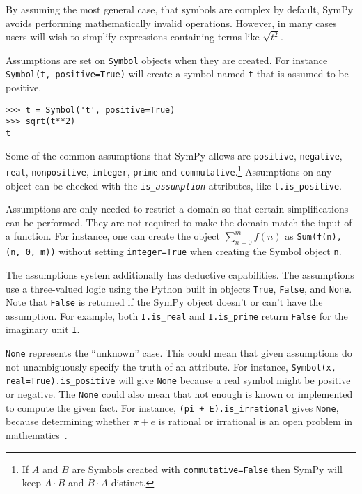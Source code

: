 By assuming the most general case, that symbols are complex by default, SymPy
avoids performing mathematically invalid operations. However, in many cases
users will wish to simplify expressions containing terms like $\sqrt{t^2}$.

Assumptions are set on \texttt{Symbol} objects when they are created. For
instance \texttt{Symbol(\textquotesingle{}t\textquotesingle{}, positive=True)} will create a symbol named
\texttt{t} that is assumed to be positive.
\begin{verbatim}
>>> t = Symbol('t', positive=True)
>>> sqrt(t**2)
t
\end{verbatim}

Some of the common assumptions that SymPy allows are \texttt{positive},
\texttt{negative}, \texttt{real}, \texttt{nonpositive}, \texttt{integer},
\texttt{prime} and \texttt{commutative}.\footnote{If $A$ and
$B$ are Symbols created with \texttt{commutative=False} then SymPy will keep
$A\cdot B$ and $B\cdot A$ distinct.} Assumptions on any object can be checked with the
\verb|is_|\texttt{\textit{assumption}} attributes, like \verb|t.is_positive|.

Assumptions are only needed to restrict a domain so that certain
simplifications can be performed. They are not required to make the domain match
the input of a function. For instance, one can create the object
$\sum_{n=0}^m f(n)$ as \verb|Sum(f(n), (n, 0, m))| without setting
\texttt{integer=True} when creating the Symbol object \texttt{n}.

The assumptions system additionally has deductive capabilities. The
assumptions use a three-valued logic using the Python built in objects
\texttt{True}, \texttt{False}, and \texttt{None}.  Note that \texttt{False}
is returned if the SymPy object doesn't or can't have the assumption.
For example, both \texttt{I.is\_real} and \texttt{I.is\_prime} return
\texttt{False} for the imaginary unit \texttt{I}.

\texttt{None} represents the
``unknown'' case. This could mean that given assumptions do not unambiguously
specify the truth of an attribute. For instance,
\texttt{Symbol(\textquotesingle{}x\textquotesingle{}, real=True).is\_positive}
will give \texttt{None} because a real symbol might be positive or negative.
The \texttt{None} could also mean that not enough is known or implemented to
compute the given fact. For instance, \texttt{(pi + E).is\_irrational} gives
\texttt{None}, because determining whether $\pi + e$ is rational or irrational
is an open problem in mathematics~\cite{lang1966introduction}.

